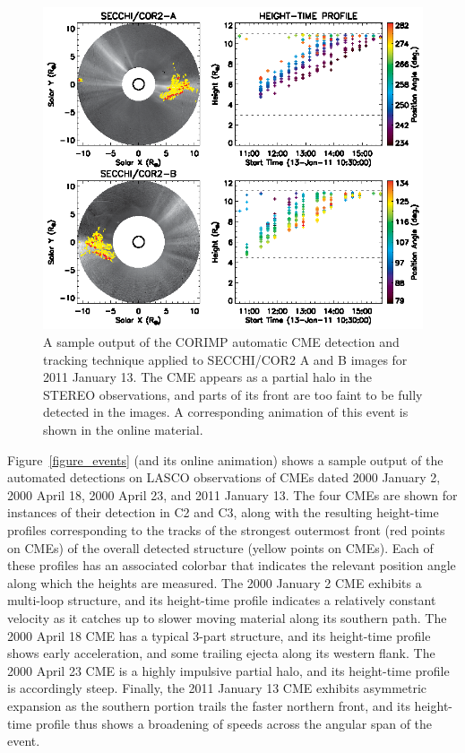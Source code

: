\documentclass[preprint2]{aastex}
\begin{document}
\begin{figure}[!t]
\centerline{\includegraphics[scale=1, clip=true, trim=0 0 0 0]{images/figure_events_secchi.eps}}
\caption{A sample output of the CORIMP automatic CME detection and tracking technique applied to SECCHI/COR2 A and B images for 2011 January 13. The CME appears as a partial halo in the STEREO observations, and parts of its front are too faint to be fully detected in the images. A corresponding animation of this event is shown in the online material.}
\label{figure_events_secchi}
\end{figure}

Figure~\ref{figure_events} (and its online animation) shows a sample output of the automated detections on LASCO observations of CMEs dated 2000 January 2, 2000 April 18, 2000 April 23, and 2011 January 13. The four CMEs are shown for instances of their detection in C2 and C3, along with the resulting height-time profiles corresponding to the tracks of the strongest outermost front (red points on CMEs) of the overall detected structure (yellow points on CMEs). Each of these profiles has an associated colorbar that indicates the relevant position angle along which the heights are measured. The 2000 January 2 CME exhibits a multi-loop structure, and its height-time profile indicates a relatively constant velocity as it catches up to slower moving material along its southern path. The 2000 April 18 CME has a typical 3-part structure, and its height-time profile shows early acceleration, and some trailing ejecta along its western flank. The 2000 April 23 CME is a highly impulsive partial halo, and its height-time profile is accordingly steep. Finally, the 2011 January 13 CME exhibits asymmetric expansion as the southern portion trails the faster northern front, and its height-time profile thus shows a broadening of speeds across the angular span of the event.
\end{document}
